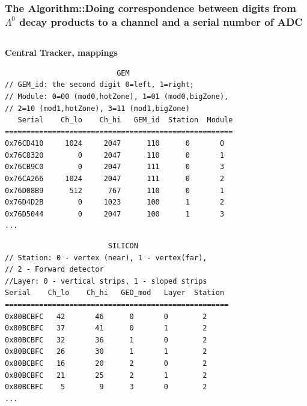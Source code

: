 \documentclass[dvipsnames] {beamer}
\begin{document}
       \begin{frame}[fragile]        
         \frametitle{\bf \centering \tiny The Algorithm::Doing correspondence between digits from $\Lambda^{0}$ decay products to a channel and a serial number of ADC}
         \vskip -0.75cm
         \bf
         \begin{columns}[t]

           \begin{block}{\bf \centering Central Tracker, mappings}
             \tiny
\begin{verbatim}
                          GEM
// GEM_id: the second digit 0=left, 1=right;
// Module: 0=00 (mod0,hotZone), 1=01 (mod0,bigZone),
// 2=10 (mod1,hotZone), 3=11 (mod1,bigZone)
   Serial    Ch_lo    Ch_hi   GEM_id  Station  Module
=====================================================
0x76CD410     1024     2047      110      0       0
0x76C8320        0     2047      110      0       1
0x76CB9C0        0     2047      111      0       3
0x76CA266     1024     2047      111      0       2
0x76D08B9      512      767      110      0       1
0x76D4D2B        0     1023      100      1       2
0x76D5044        0     2047      100      1       3
...         
\end{verbatim}
\tiny
\begin{verbatim}
                        SILICON
// Station: 0 - vertex (near), 1 - vertex(far), 
// 2 - Forward detector
//Layer: 0 - vertical strips, 1 - sloped strips
Serial    Ch_lo    Ch_hi   GEO_mod   Layer  Station
====================================================
0x80BCBFC   42       46      0       0        2
0x80BCBFC   37       41      0       1        2
0x80BCBFC   32       36      1       0        2
0x80BCBFC   26       30      1       1        2
0x80BCBFC   16       20      2       0        2
0x80BCBFC   21       25      2       1        2
0x80BCBFC    5        9      3       0        2
... 
\end{verbatim}
\end{block}


\end{columns}
\end{frame}
\end{document}

